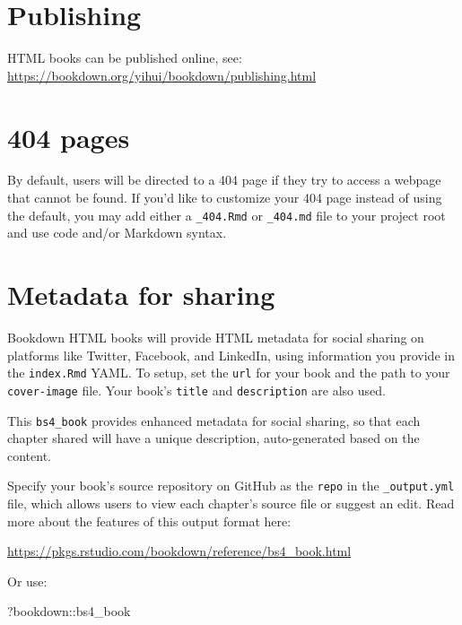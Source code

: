 \documentclass[
]{book}
\newenvironment{Shaded}{\begin{snugshade}}{\end{snugshade}}
\newcommand{\NormalTok}[1]{#1}
\newcommand{\SpecialCharTok}[1]{\textcolor[rgb]{0.00,0.00,0.00}{#1}}
\theoremstyle{definition}
\theoremstyle{definition}
\theoremstyle{definition}
\theoremstyle{definition}
\theoremstyle{remark}
\begin{document}
\hypertarget{publishing}{%
\section{Publishing}\label{publishing}}

HTML books can be published online, see: \url{https://bookdown.org/yihui/bookdown/publishing.html}

\hypertarget{pages}{%
\section{404 pages}\label{pages}}

By default, users will be directed to a 404 page if they try to access a webpage that cannot be found. If you'd like to customize your 404 page instead of using the default, you may add either a \texttt{\_404.Rmd} or \texttt{\_404.md} file to your project root and use code and/or Markdown syntax.

\hypertarget{metadata-for-sharing}{%
\section{Metadata for sharing}\label{metadata-for-sharing}}

Bookdown HTML books will provide HTML metadata for social sharing on platforms like Twitter, Facebook, and LinkedIn, using information you provide in the \texttt{index.Rmd} YAML. To setup, set the \texttt{url} for your book and the path to your \texttt{cover-image} file. Your book's \texttt{title} and \texttt{description} are also used.

This \texttt{bs4\_book} provides enhanced metadata for social sharing, so that each chapter shared will have a unique description, auto-generated based on the content.

Specify your book's source repository on GitHub as the \texttt{repo} in the \texttt{\_output.yml} file, which allows users to view each chapter's source file or suggest an edit. Read more about the features of this output format here:

\url{https://pkgs.rstudio.com/bookdown/reference/bs4_book.html}

Or use:

\begin{Shaded}
\begin{Highlighting}[]
\NormalTok{?bookdown}\SpecialCharTok{::}\NormalTok{bs4\_book}
\end{Highlighting}
\end{Shaded}
\end{document}
